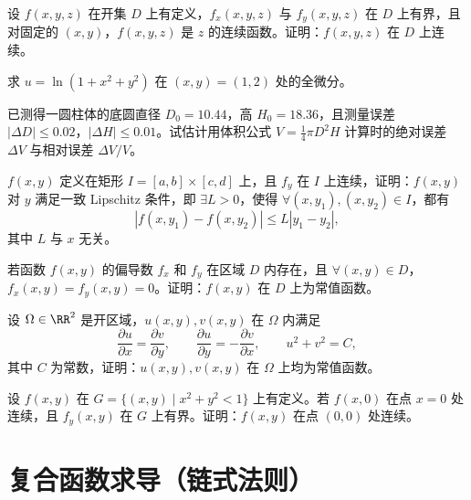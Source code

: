 \begin{xexercise}[3]
设 $f(x,y,z)$ 在开集 $D$ 上有定义，$f_x(x,y,z)$ 与 $f_y(x,y,z)$ 在 $D$ 上有界，且对固定的 $(x,y)$，$f(x,y,z)$ 是 $z$ 的连续函数。证明：$f(x,y,z)$ 在 $D$ 上连续。
\end{xexercise}

\begin{xexercise}[4]
求 $u=\ln(1+x^2+y^2)$ 在 $(x,y)=(1,2)$ 处的全微分。
\end{xexercise}

\begin{xexercise}[5]
已测得一圆柱体的底圆直径 $D_0=10.44$，高 $H_0=18.36$，且测量误差 $|\Delta D|\le0.02$，$|\Delta H|\le0.01$。试估计用体积公式 $V=\frac14\pi D^2H$ 计算时的绝对误差 $\Delta V$ 与相对误差 $\Delta V/V$。
\end{xexercise}

\begin{xexercise}[6]
$f(x,y)$ 定义在矩形 $I=[a,b]\times[c,d]$ 上，且 $f_y$ 在 $I$ 上连续，证明：$f(x,y)$ 对 $y$ 满足一致 Lipschitz 条件，即 $\exists L>0$，使得 $\forall(x,y_1),(x,y_2)\in I$，都有
  \[
    |f(x,y_1)-f(x,y_2)|\le L|y_1-y_2|,
  \]
  其中 $L$ 与 $x$ 无关。
\end{xexercise}

\begin{xexercise}[7]
若函数 $f(x,y)$ 的偏导数 $f_x$ 和 $f_y$ 在区域 $D$ 内存在，且 $\forall(x,y)\in D$，$f_x(x,y)=f_y(x,y)=0$。证明：$f(x,y)$ 在 $D$ 上为常值函数。
\end{xexercise}

\begin{xexercise}[8]
设 $\Omega\in\RR^2$ 是开区域，$u(x,y),v(x,y)$ 在 $\Omega$ 内满足
  \[
    \frac{\partial u}{\partial x}=\frac{\partial v}{\partial y},
    \qquad
    \frac{\partial u}{\partial y}=-\frac{\partial v}{\partial x},
    \qquad
    u^2+v^2=C,
  \]
  其中 $C$ 为常数，证明：$u(x,y),v(x,y)$ 在 $\Omega$ 上均为常值函数。
\end{xexercise}

\begin{xexercise}[9]
设 $f(x,y)$ 在 $G=\{(x,y)\mid x^2+y^2<1\}$ 上有定义。若 $f(x,0)$ 在点 $x=0$ 处连续，且 $f_y(x,y)$ 在 $G$ 上有界。证明：$f(x,y)$ 在点 $(0,0)$ 处连续。
\end{xexercise}

\section{复合函数求导（链式法则）}

